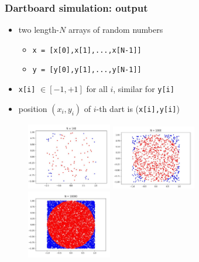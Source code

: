 \documentclass[english,14pt]{beamer}
\begin{document}

\begin{frame}[fragile]

\frametitle{Dartboard simulation: output}


\begin{itemize}
	\item two length-$N$ arrays of random numbers
	\begin{itemize}
		\item \texttt{x = [x[0],x[1],...,x[N-1]]}
		\item \texttt{y = [y[0],y[1],...,y[N-1]]}
	\end{itemize}
	\item \texttt{x[i]} $\in [-1,+1]$ for all $i$, similar for \texttt{y[i]}
	\item position $(x_i,y_i)$ of $i$-th dart is (\texttt{x[i],y[i]})
\end{itemize}

\begin{figure}[ht]
	\centering
	\includegraphics[width=0.33\textwidth]{figures/dartboard100}%
	\pause
	\includegraphics[width=0.33\textwidth]{figures/dartboard1000}%
	\pause
	\includegraphics[width=0.33\textwidth]{figures/dartboard10000}
\end{figure}

\end{frame}
\end{document}
